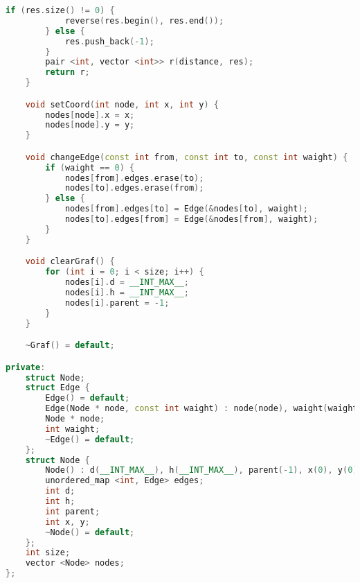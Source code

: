 \begin{lstlisting}[language=C++]
        if (res.size() != 0) {
            reverse(res.begin(), res.end());
        } else {
            res.push_back(-1);
        }
        pair <int, vector <int>> r(distance, res);
        return r;
    }

    void setCoord(int node, int x, int y) {
        nodes[node].x = x;
        nodes[node].y = y;
    }

    void changeEdge(const int from, const int to, const int waight) {
        if (waight == 0) {
            nodes[from].edges.erase(to);
            nodes[to].edges.erase(from);
        } else {
            nodes[from].edges[to] = Edge(&nodes[to], waight);
            nodes[to].edges[from] = Edge(&nodes[from], waight);
        }
    }

    void clearGraf() {
        for (int i = 0; i < size; i++) {
            nodes[i].d = __INT_MAX__;
            nodes[i].h = __INT_MAX__;
            nodes[i].parent = -1;
        }
    }

    ~Graf() = default;

private:
    struct Node;
    struct Edge {
        Edge() = default;
        Edge(Node * node, const int waight) : node(node), waight(waight) {}
        Node * node;
        int waight;
        ~Edge() = default;
    };
    struct Node {
        Node() : d(__INT_MAX__), h(__INT_MAX__), parent(-1), x(0), y(0) {}
        unordered_map <int, Edge> edges;
        int d;
        int h;
        int parent;
        int x, y;
        ~Node() = default;
    };
    int size;
    vector <Node> nodes;
};
\end{lstlisting}


